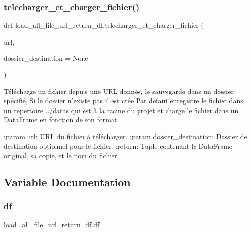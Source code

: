 \subsubsection{\texorpdfstring{telecharger\+\_\+et\+\_\+charger\+\_\+fichier()}{telecharger\_et\_charger\_fichier()}}
{\footnotesize\ttfamily def load\+\_\+all\+\_\+file\+\_\+url\+\_\+return\+\_\+df.\+telecharger\+\_\+et\+\_\+charger\+\_\+fichier (\begin{DoxyParamCaption}\item[{}]{url,  }\item[{}]{dossier\+\_\+destination = {\ttfamily None} }\end{DoxyParamCaption})}

\begin{DoxyVerb}Télécharge un fichier depuis une URL donnée, le sauvegarde dans un dossier spécifié,
Si le dossier n'existe pas il est crée
Par defaut enregistre le fichier dans un repertoire ../datas qui est à la racine du projet
et charge le fichier dans un DataFrame en fonction de son format.

:param url: URL du fichier à télécharger.
:param dossier_destination: Dossier de destination optionnel pour le fichier.
:return: Tuple contenant le DataFrame original, sa copie, et le nom du fichier.
\end{DoxyVerb}
 

\subsection{Variable Documentation}
\mbox{\label{namespaceload__all__file__url__return__df_a86fca53022cf6d2f9f7ea9d9396a5ad5}} 
\subsubsection{\texorpdfstring{df}{df}}
{\footnotesize\ttfamily load\+\_\+all\+\_\+file\+\_\+url\+\_\+return\+\_\+df.\+df}

\mbox{\label{namespaceload__all__file__url__return__df_a5dd7dfb0b58b151f2cc9123924b82bb7}} 
